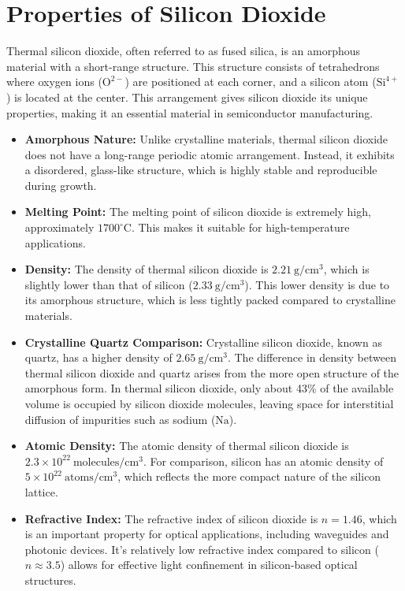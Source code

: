 \documentclass{report}
\begin{document}
\section{Properties of Silicon Dioxide}

Thermal silicon dioxide, often referred to as fused silica, is an amorphous material with a short-range structure. This structure consists of tetrahedrons where oxygen ions ($\text{O}^{2-}$) are positioned at each corner, and a silicon atom ($\text{Si}^{4+}$) is located at the center. This arrangement gives silicon dioxide its unique properties, making it an essential material in semiconductor manufacturing.

\begin{itemize}
    \item \textbf{Amorphous Nature:} Unlike crystalline materials, thermal silicon dioxide does not have a long-range periodic atomic arrangement. Instead, it exhibits a disordered, glass-like structure, which is highly stable and reproducible during growth.
    \item \textbf{Melting Point:} The melting point of silicon dioxide is extremely high, approximately $1700^{\circ}\text{C}$. This makes it suitable for high-temperature applications.
    \item \textbf{Density:} The density of thermal silicon dioxide is $2.21~\text{g}/\text{cm}^{3}$, which is slightly lower than that of silicon ($2.33~\text{g}/\text{cm}^{3}$). This lower density is due to its amorphous structure, which is less tightly packed compared to crystalline materials.
    \item \textbf{Crystalline Quartz Comparison:} Crystalline silicon dioxide, known as quartz, has a higher density of $2.65~\text{g}/\text{cm}^{3}$. The difference in density between thermal silicon dioxide and quartz arises from the more open structure of the amorphous form. In thermal silicon dioxide, only about 43\% of the available volume is occupied by silicon dioxide molecules, leaving space for interstitial diffusion of impurities such as sodium ($\text{Na}$).
    \item \textbf{Atomic Density:} The atomic density of thermal silicon dioxide is $2.3\times 10^{22}~\text{molecules}/\text{cm}^{3}$. For comparison, silicon has an atomic density of $5\times 10^{22}~\text{atoms}/\text{cm}^{3}$, which reflects the more compact nature of the silicon lattice.
    \item \textbf{Refractive Index:} The refractive index of silicon dioxide is $n=1.46$, which is an important property for optical applications, including waveguides and photonic devices. It's relatively low refractive index compared to silicon ($n \approx 3.5$) allows for effective light confinement in silicon-based optical structures.

\end{itemize}
\end{document}
